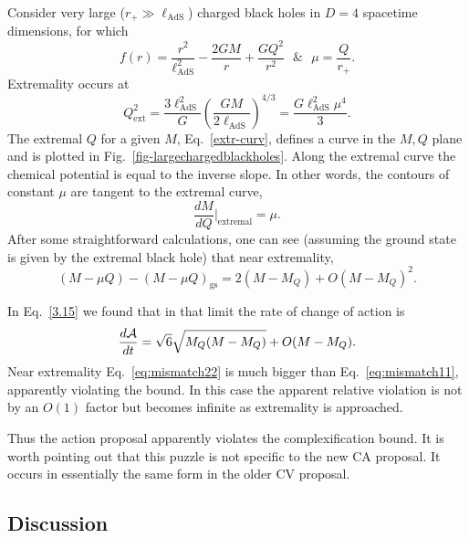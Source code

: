 \documentclass[12pt]{article}
\numberwithin{equation}{section}
\newcommand{\be}{\begin{equation}}
\newcommand{\ee}{\end{equation}}
\def\CA{{\cal A}}
\newcommand{\lads}{\ell_{\text{AdS}}}
\begin{document}
Consider very large ($r_+ \gg \lads$) charged black holes in $D=4$ spacetime dimensions, for which
\be
f(r)= \frac{r^2}{\lads^2} - \frac{2GM}{r} + \frac{GQ^2}{r^2} \ \ \ \& \ \ \  \mu = \frac{Q}{r_+}.
\ee
Extremality occurs at
\be
Q^2_\textrm{ext} = \frac{3\lads^2}{G}\left(  \frac{GM}{2\lads}      \right)^{4/3}=\frac{G\lads^2\mu^4}{3}.
\label{extr-curv}
\ee
The extremal $Q$ for a given $M$, Eq.~\ref{extr-curv},  defines a curve in the $M,Q$ plane  and is plotted in Fig.~\ref{fig-largechargedblackholes}.
%
%
%
%
%
Along the extremal curve the chemical potential is equal to the inverse slope. In other words, the contours of constant $\mu$ are tangent to the extremal curve,
\be
\frac{dM}{dQ} \biggl|_\textrm{extremal} = \mu.
\ee
%
After some straightforward calculations, one can see (assuming the ground state is given by the extremal black hole) that near extremality,
\be
(M-\mu Q)-(M-\mu Q)_\textrm{gs}=
2(M-M_Q) + O(M-M_Q)^2. \label{eq:mismatch11}
\ee


In Eq.~\ref{3.15}  \rm
we found that in that limit the rate of change of action is
\be
\frac{d \CA}{dt} = \sqrt{6} \sqrt{M_{Q}(M-M_{Q})} + O(M - M_Q) .
\label{eq:mismatch22}
\ee
Near extremality Eq.~\ref{eq:mismatch22} is much bigger than Eq.~\ref{eq:mismatch11}, apparently violating the bound. In this case the apparent relative violation is not by an $O(1)$ factor but becomes infinite as extremality is approached.



Thus the action proposal apparently violates the complexification bound. It is worth pointing out that this puzzle is not specific to the new CA proposal. It occurs in essentially the same form in the older CV proposal.


\subsection{Discussion}
\label{sec:A Pattern}
\end{document}
